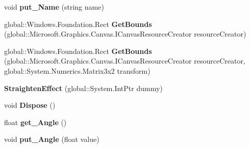 \begin{DoxyCompactItemize}
void {\bfseries put\+\_\+\+Name} (string name)
\item 
\mbox{\label{class_microsoft_1_1_graphics_1_1_canvas_1_1_effects_1_1_straighten_effect_af64b502b0dd6c00643c16be7bcfdcef7}} 
global\+::\+Windows.\+Foundation.\+Rect {\bfseries Get\+Bounds} (global\+::\+Microsoft.\+Graphics.\+Canvas.\+I\+Canvas\+Resource\+Creator resource\+Creator)
\item 
\mbox{\label{class_microsoft_1_1_graphics_1_1_canvas_1_1_effects_1_1_straighten_effect_ad03b4480cb1a04a86f955f4367f7a990}} 
global\+::\+Windows.\+Foundation.\+Rect {\bfseries Get\+Bounds} (global\+::\+Microsoft.\+Graphics.\+Canvas.\+I\+Canvas\+Resource\+Creator resource\+Creator, global\+::\+System.\+Numerics.\+Matrix3x2 transform)
\item 
\mbox{\label{class_microsoft_1_1_graphics_1_1_canvas_1_1_effects_1_1_straighten_effect_aa615746cf5c95aaca45a53174de77830}} 
{\bfseries Straighten\+Effect} (global\+::\+System.\+Int\+Ptr dummy)
\item 
\mbox{\label{class_microsoft_1_1_graphics_1_1_canvas_1_1_effects_1_1_straighten_effect_a6b0f5e8965a47aa6c9936114246eb1c7}} 
void {\bfseries Dispose} ()
\item 
\mbox{\label{class_microsoft_1_1_graphics_1_1_canvas_1_1_effects_1_1_straighten_effect_a0ed44f705cd9b56c26587217c200b6d1}} 
float {\bfseries get\+\_\+\+Angle} ()
\item 
\mbox{\label{class_microsoft_1_1_graphics_1_1_canvas_1_1_effects_1_1_straighten_effect_a61d26b5e4774cad176cd3ee601b7faf4}} 
void {\bfseries put\+\_\+\+Angle} (float value)
\item 
\mbox{\label{class_microsoft_1_1_graphics_1_1_canvas_1_1_effects_1_1_straighten_effect_adda549672074ceb59e7119d5cc5f4cbc}} 

\end{DoxyCompactItemize}
